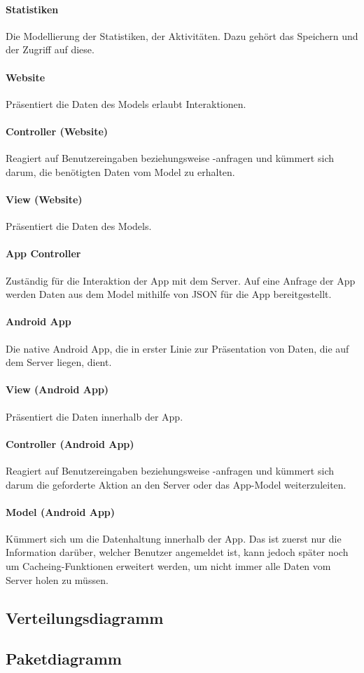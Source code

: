 \paragraph{Statistiken} Die Modellierung der Statistiken, der Aktivitäten. Dazu gehört das Speichern und der Zugriff auf diese.

\paragraph{Website} Präsentiert die Daten des Models erlaubt Interaktionen.

\paragraph{Controller (Website)} Reagiert auf Benutzereingaben beziehungsweise -anfragen und kümmert sich darum, die benötigten Daten vom Model zu erhalten.

\paragraph{View (Website)} Präsentiert die Daten des Models.

\paragraph{App Controller} Zuständig für die Interaktion der App mit dem Server. Auf eine Anfrage der App werden Daten aus dem Model mithilfe von JSON für die App bereitgestellt.

\paragraph{Android App} Die native Android App, die in erster Linie zur Präsentation von Daten, die auf dem Server liegen, dient.

\paragraph{View (Android App)} Präsentiert die Daten innerhalb der App.

\paragraph{Controller (Android App)} Reagiert auf Benutzereingaben beziehungsweise -anfragen und kümmert sich darum die geforderte Aktion an den Server oder das App-Model weiterzuleiten.

\paragraph{Model (Android App)} Kümmert sich um die Datenhaltung innerhalb der App. Das ist zuerst nur die Information darüber, welcher Benutzer angemeldet ist, kann jedoch später noch um Cacheing-Funktionen erweitert werden, um nicht immer alle Daten vom Server holen zu müssen.

\subsection{Verteilungsdiagramm}

\subsection{Paketdiagramm}